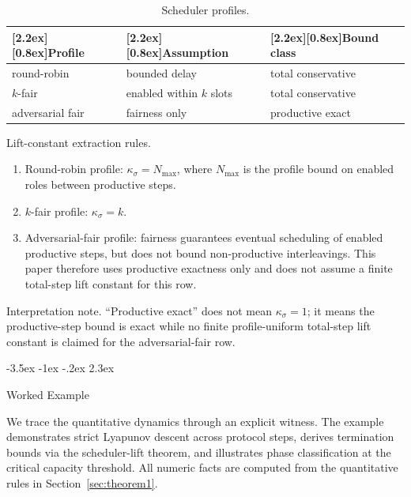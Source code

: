 \documentclass[a4paper,10pt,twocolumn,english]{article}
\makeatletter
\renewcommand{\section}{\@startsection{section}{1}{\z@}%
  {-3.5ex \@plus -1ex \@minus -.2ex}%
  {2.3ex}%
  {\raggedright\normalfont\large\bfseries}}
\numberwithin{equation}{section}
\theoremstyle{paperdef}
\theoremstyle{paperplain}
\theoremstyle{paperdef}
\theoremstyle{paperremark}
\newcommand{\thead}[1]{\textbf{\raisebox{0pt}[2.2ex][0.8ex]{#1}}}
\makeatother
\begin{document}
\begin{table}[H]
	\centering
	\footnotesize
	\begin{tabularx}{\columnwidth}{@{}L{0.21\columnwidth}L{0.42\columnwidth}L{0.27\columnwidth}@{}}
		\toprule
		\thead{Profile}  & \thead{Assumption}       & \thead{Bound class} \\
		\midrule
		round-robin      & bounded delay            & total conservative  \\
		$k$-fair         & enabled within $k$ slots & total conservative  \\
		adversarial fair & fairness only            & productive exact    \\
		\bottomrule
	\end{tabularx}
	\caption{Scheduler profiles.}
	\label{tab:p2-scheduler-profiles}
\end{table}

Lift-constant extraction rules.
\begin{enumerate}
	\item Round-robin profile: $\kappa_\sigma = N_{\max}$, where $N_{\max}$ is the profile bound on enabled roles between productive steps.
	\item $k$-fair profile: $\kappa_\sigma = k$.
	\item Adversarial-fair profile: fairness guarantees eventual scheduling of enabled productive steps, but does not bound non-productive interleavings. This paper therefore uses productive exactness only and does not assume a finite total-step lift constant for this row.
\end{enumerate}
Interpretation note. ``Productive exact'' does not mean $\kappa_\sigma=1$; it
means the productive-step bound is exact while no finite profile-uniform total-step
lift constant is claimed for the adversarial-fair row.

\section{Worked Example}
\label{sec:example}

We trace the quantitative dynamics through an explicit witness. The example demonstrates strict Lyapunov descent across protocol steps, derives termination bounds via the scheduler-lift theorem, and illustrates phase classification at the critical capacity threshold. All numeric facts are computed from the quantitative rules in Section~\ref{sec:theorem1}.
\end{document}
